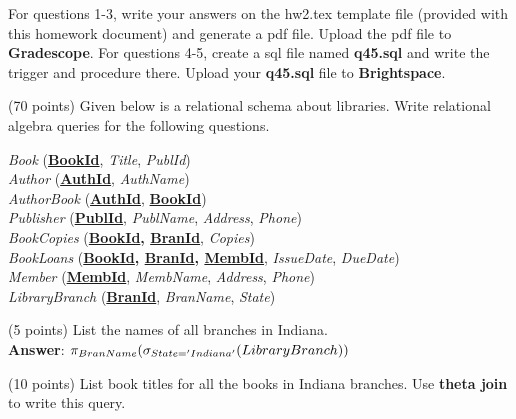 For questions 1-3, write your answers on the hw2.tex template file (provided with this homework document) and generate a pdf file. Upload the pdf file to \textbf{Gradescope}. For questions 4-5, create a sql file named \textbf{q45.sql} and write the trigger and procedure there. Upload your \textbf{q45.sql} file to \textbf{Brightspace}.\\

\begin{questions}

\question (70 points) Given below is a relational schema about libraries. Write relational algebra queries for the following questions.\\

\begin{addmargin}[1em]{2em}%

    \textit{Book} (\textbf{\underline{BookId}},  \textit{Title}, \textit{PublId})\\
    \textit{Author} (\textbf{\underline{AuthId}}, \textit{AuthName})\\
    \textit{AuthorBook} (\textbf{\underline{AuthId}}, \textbf{\underline{BookId}})\\
    \textit{Publisher} (\textbf{\underline{PublId}}, \textit{PublName}, \textit{Address}, \textit{Phone})\\
    \textit{BookCopies} (\textbf{\underline{BookId}, \underline{BranId}}, \textit{Copies})\\
    \textit{BookLoans} (\textbf{\underline{BookId}, \underline{BranId}, \underline{MembId}}, \textit{IssueDate}, \textit{DueDate})\\
    \textit{Member} (\textbf{\underline{MembId}},  \textit{MembName}, \textit{Address}, \textit{Phone})\\
    \textit{LibraryBranch} (\textbf{\underline{BranId}}, \textit{BranName}, \textit{State})\\
    
\end{addmargin}

\begin{choices}

	\choice(5 points) List the names of all branches in Indiana.\\
	\textbf{Answer}:
            $\pi_{BranName}(\sigma_{State='Indiana' } (LibraryBranch) )
            $
	
	\choice(10 points) List book titles for all the books in Indiana branches. Use \textbf{theta join} to write this query. 
	

\end{choices}
\end{questions}
